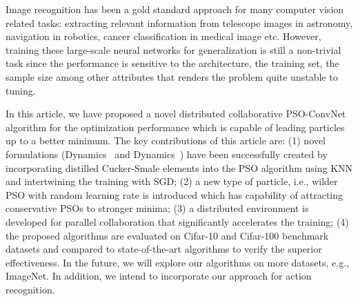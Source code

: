 \documentclass{ieeeaccess}
\begin{document}
\label{sec:conclusion}
Image recognition has been a gold standard approach for many computer vision related tasks: extracting relevant information from telescope images in astronomy, navigation in robotics, cancer classification in medical image etc. However, training these large-scale neural networks for generalization is still a non-trivial task since the performance is sensitive to the architecture, the training set, the sample size among other attributes that renders the problem quite unstable to tuning. 

In this article, we have proposed a novel distributed collaborative PSO-ConvNet algorithm for the optimization performance which is capable of leading particles up to a better minimum. The key contributions of this article are: (1) novel formulations (Dynamics~ and Dynamics~) have been successfully created by incorporating distilled Cucker-Smale elements into the PSO algorithm using KNN and intertwining the training with SGD; (2) a new type of particle, i.e., wilder PSO with random learning rate is introduced which has capability of attracting conservative PSOs to stronger minima; (3) a distributed environment is developed for parallel collaboration that significantly accelerates the training; (4) the proposed algorithms are evaluated on Cifar-10 and Cifar-100 benchmark datasets and compared to state-of-the-art algorithms to verify the superior effectiveness. In the future, we will explore our algorithms on more datasets, e.g., ImageNet. In addition, we intend to incorporate our approach for action recognition.
\end{document}
